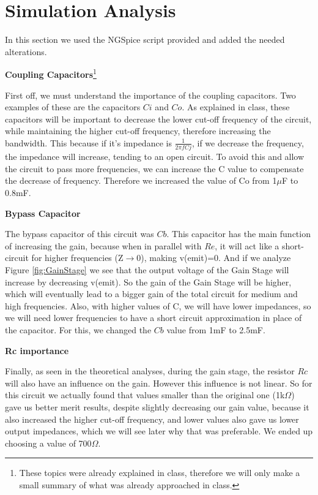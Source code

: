 \section{Simulation Analysis}
\label{sec:simulation}
In this section we used the NGSpice script provided and added the needed alterations.

\vspace{0.5cm}
\textbf{Coupling Capacitors}\footnote{These topics were already explained in class, therefore we will only make a small summary of what was already approached in class.}


First off, we must understand the importance of the coupling capacitors. Two examples of these are the capacitors $Ci$ and $Co$. As explained in class, these capacitors will be important to decrease the lower cut-off frequency of the circuit, while maintaining the higher cut-off frequency, therefore increasing the bandwidth. This because if it's impedance is $\frac{1}{2\pi f C j}$, if we decrease the frequency, the impedance will increase, tending to an open circuit. To avoid this and allow the circuit to pass more frequencies, we can increase the C value to compensate the decrease of frequency. Therefore we increased the value of Co from 1$\mu$F to 0.8mF. 

\vspace{0.5cm}
\textbf{Bypass Capacitor}


The bypass capacitor of this circuit was $Cb$. This capacitor has the main function of increasing the gain, because when in parallel with $Re$, it will act like a short-circuit for higher frequencies (Z$\rightarrow$0), making v(emit)=0. And if we analyze Figure \ref{fig:GainStage} we see that the output voltage of the Gain Stage will increase by decreasing v(emit). So the gain of the Gain Stage will be higher, which will eventually lead to a bigger gain of the total circuit for medium and high frequencies. Also, with higher values of C, we will have lower impedances, so we will need lower frequencies to have a short circuit approximation in place of the capacitor.  For this, we changed the $Cb$ value from 1mF to 2.5mF.

\vspace{0.5cm}
\textbf{Rc importance}

Finally, as seen in the theoretical analyses, during the gain stage, the resistor $Rc$ will also have an influence on the gain. However this influence is not linear. So for this circuit we actually found that values smaller than the original one (1k$\Omega$) gave us better merit results, despite slightly decreasing our gain value, because it also increased the higher cut-off frequency, and lower values also gave us lower output impedances, which we will see later why that was preferable. We ended up choosing a value of 700$\Omega$.

